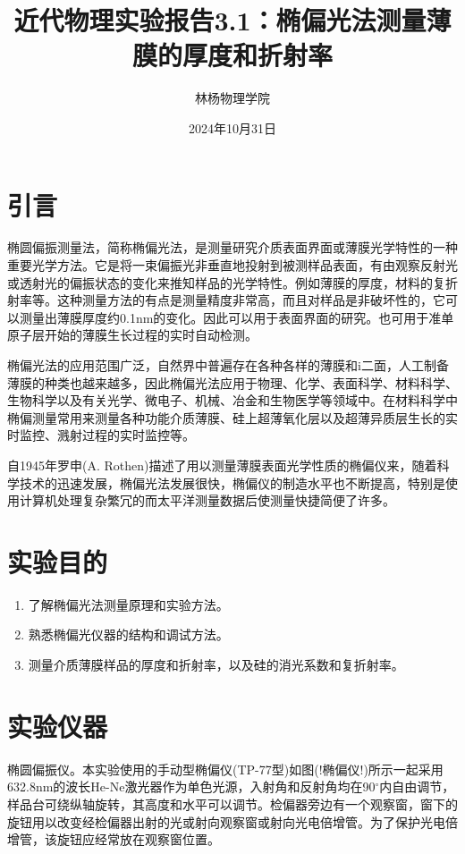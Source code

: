 \documentclass[a4paper]{article}
\title{近代物理实验报告3.1：椭偏光法测量薄膜的厚度和折射率}
\author{林杨\quad 211840092\quad 物理学院}
\date{2024年10月31日}
\begin{document}
\maketitle


\section{引言}
椭圆偏振测量法，简称椭偏光法，是测量研究介质表面界面或薄膜光学特性的一种重要光学方法。它是将一束偏振光非垂直地投射到被测样品表面，有由观察反射光或透射光的偏振状态的变化来推知样品的光学特性。例如薄膜的厚度，材料的复折射率等。这种测量方法的有点是测量精度非常高，而且对样品是非破坏性的，它可以测量出薄膜厚度约0.1nm的变化。因此可以用于表面界面的研究。也可用于准单原子层开始的薄膜生长过程的实时自动检测。

椭偏光法的应用范围广泛，自然界中普遍存在各种各样的薄膜和i二面，人工制备薄膜的种类也越来越多，因此椭偏光法应用于物理、化学、表面科学、材料科学、生物科学以及有关光学、微电子、机械、冶金和生物医学等领域中。在材料科学中椭偏测量常用来测量各种功能介质薄膜、硅上超薄氧化层以及超薄异质层生长的实时监控、溅射过程的实时监控等。

自1945年罗申(A. Rothen)描述了用以测量薄膜表面光学性质的椭偏仪来，随着科学技术的迅速发展，椭偏光法发展很快，椭偏仪的制造水平也不断提高，特别是使用计算机处理复杂繁冗的而太平洋测量数据后使测量快捷简便了许多。

\section{实验目的}
\begin{enumerate}
\item 了解椭偏光法测量原理和实验方法。
\item 熟悉椭偏光仪器的结构和调试方法。
\item 测量介质薄膜样品的厚度和折射率，以及硅的消光系数和复折射率。
\end{enumerate}

\section{实验仪器}
椭圆偏振仪。本实验使用的手动型椭偏仪(TP-77型)如图(!椭偏仪!)所示一起采用632.8nm的波长He-Ne激光器作为单色光源，入射角和反射角均在90$^{\circ}$内自由调节，样品台可绕纵轴旋转，其高度和水平可以调节。检偏器旁边有一个观察窗，窗下的旋钮用以改变经检偏器出射的光或射向观察窗或射向光电倍增管。为了保护光电倍增管，该旋钮应经常放在观察窗位置。
\end{document}
